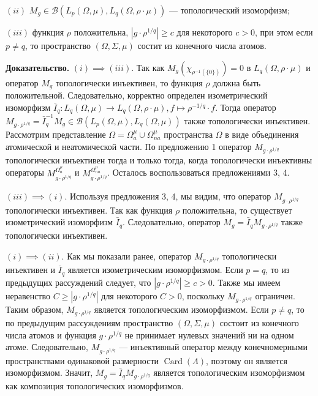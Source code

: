 \documentclass[11pt,twoside]{article}
\begin{document}
    $(ii)$ $M_g\in\mathcal{B}(L_p(\Omega,\mu),L_q(\Omega,\rho\cdot\mu))$ ---
        топологический изоморфизм;

    $(iii)$ функция $\rho$ положительна, $|g\cdot \rho^{1/q}|\geq c$ для
        некоторого $c>0$, при этом если $p\neq q$, то пространство
    $(\Omega,\Sigma,\mu)$ состит из конечного числа атомов.

        \textbf{Доказательство.} $(i)$$\implies$$ (iii)$. Так как
    $M_g(\chi_{\rho^{-1}(\{0\})})=0$ в $L_q(\Omega,\rho\cdot\mu)$ и оператор
    $M_g$ топологически инъективен, то функция $\rho$ должна быть положительной.
        Следовательно, корректно определен изометрический изоморфизм
    $\bar{I}_q:L_q(\Omega,\mu)\to L_q(\Omega,\rho\cdot\mu),f\mapsto
    \rho^{-1/q}\cdot f$. Тогда оператор $M_{g\cdot\rho^{1/q}}=\bar{I}_q^{-1}
    M_g\in\mathcal{B}(L_p(\Omega,\mu),L_q(\Omega,\mu))$ также топологически
        инъективен. Рассмотрим представление
    $\Omega=\Omega_a^{\mu}\cup\Omega_{na}^{\mu}$ пространства $\Omega$ в виде
        объединения атомической и неатомической части. По предложению  1 оператор
    $M_{g\cdot\rho^{1/q}}$ топологически инъективен тогда и только тогда, когда
        топологически инъективны операторы $M_{g\cdot\rho^{1/q}}^{\Omega_a^{\mu}}$ и
    $M_{g\cdot\rho^{1/q}}^{\Omega_{na}^{\mu}}$. Осталось воспользоваться
        предложениями 3, 4.

    $(iii)$$\implies$$ (i)$. Используя предложения 3, 4, мы видим, что оператор
    $M_{g\cdot\rho^{1/q}}$ топологически инъективен. Так как функция $\rho$
        положительна, то существует изометрический изоморфизм $\bar{I}_q$.
        Следовательно, оператор $M_g=\bar{I}_q M_{g\cdot\rho^{1/q}}$ также
        топологически инъективен.

    $(i)$$\implies$$ (ii)$. Как мы показали ранее, оператор
    $M_{g\cdot\rho^{1/q}}$ топологически инъективен и $\bar{I}_q$ является
        изометрическим изоморфизмом. Если $p=q$, то из предыдущих рассуждений
        следует, что $|{g\cdot\rho^{1/q}}|\geq c>0$. Также мы имеем неравенство
    $C\geq |{g\cdot\rho^{1/q}}|$ для некоторого $C>0$, поскольку
    $M_{{g\cdot\rho^{1/q}}}$ ограничен. Таким образом,
    $M_{{g\cdot\rho^{1/q}}}$ является топологическим изоморфизмом. Если
    $p\neq q$, то по предыдущим рассуждениям пространство
    $(\Omega,\Sigma,\mu)$ состоит из конечного числа атомов и функция
    $g\cdot\rho^{1/q}$ не принимает нулевых значений ни на одном атоме.
        Следовательно, $M_{g\cdot\rho^{1/q}}$ --- инъективный оператор между
        конечномерными пространствами одинаковой размерности
    $\operatorname{Card}(\Lambda)$, поэтому он является изоморфизмом.
        Значит, $M_g=\bar{I}_q M_{g\cdot\rho^{1/q}}$ является топологическим
        изоморфизмом как композиция топологических изоморфизмов.
\end{document}
